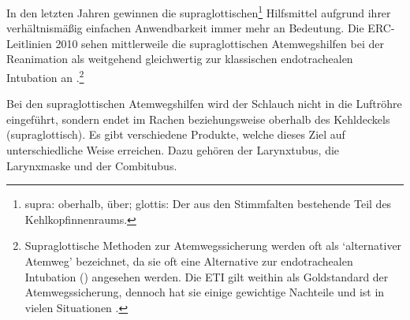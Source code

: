 {In den letzten Jahren gewinnen die
supraglottischen\footnote{ supra: oberhalb, über;
 glottis: Der aus den Stimmfalten bestehende
Teil des Kehlkopfinnenraums.} Hilfsmittel aufgrund ihrer
verhältnismäßig einfachen Anwendbarkeit immer mehr an
Bedeutung. Die ERC-Leitlinien 2010 sehen mittlerweile die
supraglottischen Atemwegshilfen bei der Reanimation als
weitgehend gleichwertig zur klassischen endotrachealen
Intubation an
\cite[p.1319,1321]{Erc2010Sec4}.\footnote{Supraglottische
Methoden zur Atemwegssicherung werden oft als
\enquote*{alternativer Atemweg} bezeichnet, da sie oft eine
Alternative zur endotrachealen Intubation ()
angesehen werden. Die ETI gilt weithin als Goldstandard der
Atemwegssicherung, dennoch hat sie einige gewichtige
Nachteile und ist in vielen Situationen . }

Bei den supraglottischen Atemwegshilfen wird der Schlauch
nicht in die Luftröhre eingeführt, sondern endet im Rachen
beziehungsweise oberhalb des Kehldeckels (supraglottisch).
Es gibt verschiedene Produkte, welche dieses Ziel auf
unterschiedliche Weise erreichen. Dazu gehören der
Larynxtubus{\texttrademark}, die Larynxmaske und der Combitubus.

 }{}{}{}{}{}



